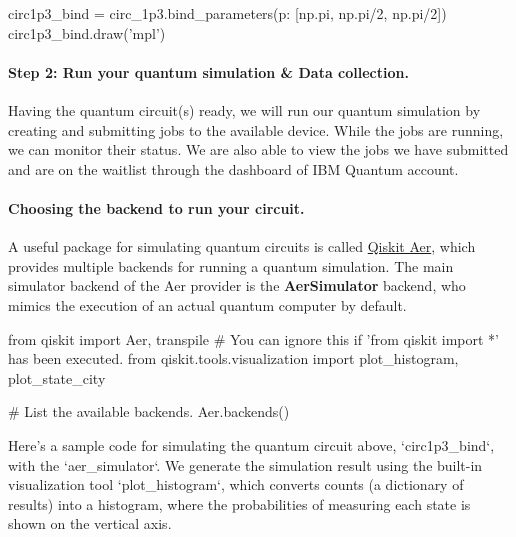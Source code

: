 \documentclass[%
oneside,                 %
final,                   %
10pt]{article}
\begin{document}
\bpycod
circ1p3_bind = circ_1p3.bind_parameters({p: [np.pi, np.pi/2, np.pi/2]})
circ1p3_bind.draw('mpl')

\epycod


\paragraph{Step 2: Run your quantum simulation {\&} Data collection.}
Having the quantum circuit(s) ready, we will run our quantum
simulation by creating and submitting jobs to the available
device. While the jobs are running, we can monitor their status. We
are also able to view the jobs we have submitted and are on the
waitlist through the dashboard of IBM Quantum account.

\paragraph{Choosing the backend to run your circuit.}
A useful package for simulating quantum circuits is called \href{{https://qiskit.org/documentation/tutorials/simulators/1_aer_provider.html}}{Qiskit Aer},
which provides multiple backends for running a quantum simulation. The main simulator backend of the Aer provider is the \textbf{AerSimulator} backend, who mimics the execution of an actual quantum computer by default.




\bpycod
from qiskit import Aer, transpile  # You can ignore this if 'from qiskit import *' has been executed.
from qiskit.tools.visualization import plot_histogram, plot_state_city

\epycod





\bpycod
# List the available backends.
Aer.backends()

\epycod




\bpycod
Here's a sample code for simulating the quantum circuit above, `circ1p3_bind`, with the `aer_simulator`. We generate the simulation result using the built-in visualization tool `plot_histogram`, which converts counts (a dictionary of results) into a histogram, where the probabilities of measuring each state is shown on the vertical axis.

\epycod
\end{document}
